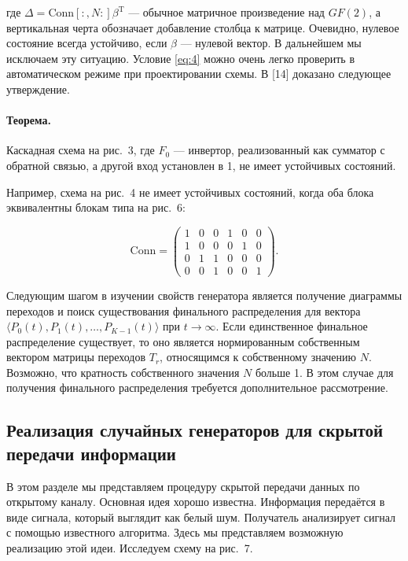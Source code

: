 \documentclass[a4paper,12pt]{article}
\begin{document}
где \(\Delta = \mathrm{Conn}[:,N:]\beta^{\mathrm{T}}\) --- обычное матричное произведение над \(GF(2)\), а вертикальная черта обозначает добавление столбца к матрице. Очевидно, нулевое состояние всегда устойчиво, если \(\beta\) --- нулевой вектор. В дальнейшем мы исключаем эту ситуацию. Условие \eqref{eq:4} можно очень легко проверить в автоматическом режиме при проектировании схемы. В [14] доказано следующее утверждение.

\paragraph{Теорема.} Каскадная схема на рис.~3, где \(F_0\) --- инвертор, реализованный как сумматор с обратной связью, а другой вход установлен в 1, не имеет устойчивых состояний.

Например, схема на рис.~4 не имеет устойчивых состояний, когда оба блока эквивалентны блокам типа на рис.~6:

\begin{equation}
\mathrm{Conn} =
\begin{pmatrix}
1 & 0 & 0 & 1 & 0 & 0 \\
1 & 0 & 0 & 0 & 1 & 0 \\
0 & 1 & 1 & 0 & 0 & 0 \\
0 & 0 & 1 & 0 & 0 & 1
\end{pmatrix}. \label{eq:5}
\end{equation}

Следующим шагом в изучении свойств генератора является получение диаграммы переходов и поиск существования финального распределения для вектора \(\langle P_0(t),\allowbreak P_1(t),\allowbreak \dots,\allowbreak P_{K-1}(t) \rangle\) при \(t \to \infty\). Если единственное финальное распределение существует, то оно является нормированным собственным вектором матрицы переходов \(T_r\), относящимся к собственному значению \(N\). Возможно, что кратность собственного значения \(N\) больше 1. В этом случае для получения финального распределения требуется дополнительное рассмотрение.

\subsection{Реализация случайных генераторов для скрытой передачи информации}

В этом разделе мы представляем процедуру скрытой передачи данных по открытому каналу. Основная идея хорошо известна. Информация передаётся в виде сигнала, который выглядит как белый шум. Получатель анализирует сигнал с помощью известного алгоритма. Здесь мы представляем возможную реализацию этой идеи. Исследуем схему на рис.~7.
\end{document}
